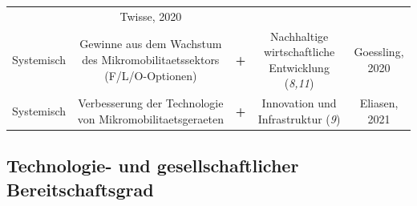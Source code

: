 \documentclass[
]{book}
\begin{document}
\begin{longtable}[]{@{}ccccc@{}}
\begin{minipage}[t]{0.17\columnwidth}
\end{minipage} & \begin{minipage}[t]{0.17\columnwidth}\centering
Twisse, 2020\strut
\end{minipage}\tabularnewline
\begin{minipage}[t]{0.17\columnwidth}\centering
Systemisch\strut
\end{minipage} & \begin{minipage}[t]{0.16\columnwidth}\centering
Gewinne aus dem Wachstum des Mikromobilitaetssektors (F/L/O-Optionen)\strut
\end{minipage} & \begin{minipage}[t]{0.17\columnwidth}\centering
\textbf{+}\strut
\end{minipage} & \begin{minipage}[t]{0.17\columnwidth}\centering
Nachhaltige wirtschaftliche Entwicklung (\emph{8,11})\strut
\end{minipage} & \begin{minipage}[t]{0.17\columnwidth}\centering
Goessling, 2020\strut
\end{minipage}\tabularnewline
\begin{minipage}[t]{0.17\columnwidth}\centering
Systemisch\strut
\end{minipage} & \begin{minipage}[t]{0.16\columnwidth}\centering
Verbesserung der Technologie von Mikromobilitaetsgeraeten\strut
\end{minipage} & \begin{minipage}[t]{0.17\columnwidth}\centering
\textbf{+}\strut
\end{minipage} & \begin{minipage}[t]{0.17\columnwidth}\centering
Innovation und Infrastruktur (\emph{9})\strut
\end{minipage} & \begin{minipage}[t]{0.17\columnwidth}\centering
Eliasen, 2021\strut
\end{minipage}\tabularnewline
\bottomrule
\end{longtable}

\hypertarget{technologie--und-gesellschaftlicher-bereitschaftsgrad-19}{%
\subsection*{Technologie- und gesellschaftlicher Bereitschaftsgrad}\label{technologie--und-gesellschaftlicher-bereitschaftsgrad-19}}
\end{document}
